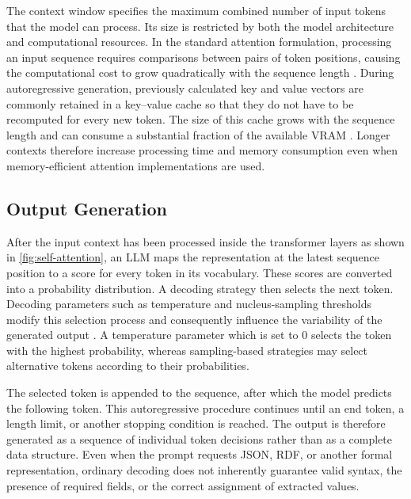 The context window specifies the maximum combined number of input tokens that the model can process.
Its size is restricted by both the model architecture and computational resources.
In the standard attention formulation, processing an input sequence requires comparisons between pairs of token positions, causing the computational cost to grow quadratically with the sequence length \cite{vaswani2017attention}.
During autoregressive generation, previously calculated key and value vectors are commonly retained in a key--value cache so that they do not have to be recomputed for every new token.
The size of this cache grows with the sequence length and can consume a substantial fraction of the available \ac{VRAM} \cite{kwon2023pagedattention}.
Longer contexts therefore increase processing time and memory consumption even when memory-efficient attention implementations are used.

\subsection{Output Generation}
\label{subsec:output-generation}

After the input context has been processed inside the transformer layers as shown in \cref{fig:self-attention}, an LLM maps the representation at the latest sequence position to a score for every token in its vocabulary.
These scores are converted into a probability distribution.
A decoding strategy then selects the next token.
Decoding parameters such as temperature and nucleus-sampling thresholds modify this selection process and consequently influence the variability of the generated output \cite{holtzman2019curious}.
A temperature parameter which is set to 0 selects the token with the highest probability, whereas sampling-based strategies may select alternative tokens according to their probabilities.

The selected token is appended to the sequence, after which the model predicts the following token.
This autoregressive procedure continues until an end token, a length limit, or another stopping condition is reached.
The output is therefore generated as a sequence of individual token decisions rather than as a complete data structure.
Even when the prompt requests \ac{JSON}, \ac{RDF}, or another formal representation, ordinary decoding does not inherently guarantee valid syntax, the presence of required fields, or the correct assignment of extracted values.

